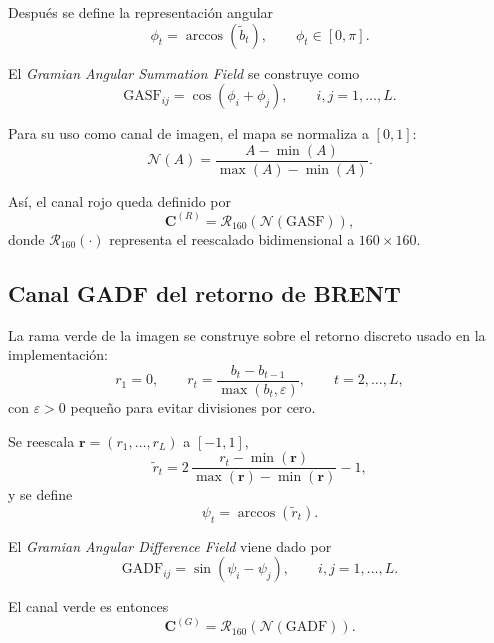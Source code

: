 \documentclass[11pt,a4paper]{article}
\begin{document}
Después se define la representación angular
\begin{equation}
\phi_t = \arccos(\tilde b_t),
\qquad \phi_t \in [0,\pi].
\end{equation}

El \emph{Gramian Angular Summation Field} se construye como
\begin{equation}
\mathrm{GASF}_{ij} = \cos(\phi_i + \phi_j),
\qquad i,j=1,\dots,L.
\end{equation}

Para su uso como canal de imagen, el mapa se normaliza a $[0,1]$:
\begin{equation}
\mathcal{N}(A) = \frac{A - \min(A)}{\max(A) - \min(A)}.
\end{equation}

Así, el canal rojo queda definido por
\begin{equation}
\mathbf{C}^{(R)} = \mathcal{R}_{160}\!\left(\mathcal{N}(\mathrm{GASF})\right),
\end{equation}
donde $\mathcal{R}_{160}(\cdot)$ representa el reescalado bidimensional a $160\times 160$.

\subsection{Canal GADF del retorno de BRENT}

La rama verde de la imagen se construye sobre el retorno discreto usado en la implementación:
\begin{equation}
 r_1 = 0,
 \qquad
 r_t = \frac{b_t - b_{t-1}}{\max(b_t,\varepsilon)},
 \qquad t=2,\dots,L,
\end{equation}
con $\varepsilon>0$ pequeño para evitar divisiones por cero.

Se reescala $\mathbf{r}=(r_1,\dots,r_L)$ a $[-1,1]$,
\begin{equation}
\tilde r_t = 2\,\frac{r_t - \min(\mathbf{r})}{\max(\mathbf{r}) - \min(\mathbf{r})} - 1,
\end{equation}
y se define
\begin{equation}
\psi_t = \arccos(\tilde r_t).
\end{equation}

El \emph{Gramian Angular Difference Field} viene dado por
\begin{equation}
\mathrm{GADF}_{ij} = \sin(\psi_i - \psi_j),
\qquad i,j=1,\dots,L.
\end{equation}

El canal verde es entonces
\begin{equation}
\mathbf{C}^{(G)} = \mathcal{R}_{160}\!\left(\mathcal{N}(\mathrm{GADF})\right).
\end{equation}
\end{document}
